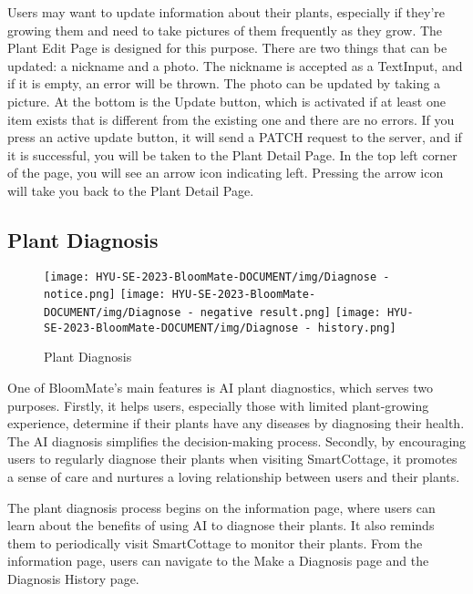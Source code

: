 \documentclass[conference, a4paper]{IEEEtran}
\begin{document}
    Users may want to update information about their plants, especially if they're growing them and need to take pictures of them frequently as they grow. The Plant Edit Page is designed for this purpose. There are two things that can be updated: a nickname and a photo. The nickname is accepted as a TextInput, and if it is empty, an error will be thrown. The photo can be updated by taking a picture. At the bottom is the Update button, which is activated if at least one item exists that is different from the existing one and there are no errors. If you press an active update button, it will send a PATCH request to the server, and if it is successful, you will be taken to the Plant Detail Page. In the top left corner of the page, you will see an arrow icon indicating left. Pressing the arrow icon will take you back to the Plant Detail Page.
    

    \subsection{Plant Diagnosis}
    \begin{figure}[h]
    \centerline{
        \texttt{[image: HYU-SE-2023-BloomMate-DOCUMENT/img/Diagnose - notice.png]}
        \texttt{[image: HYU-SE-2023-BloomMate-DOCUMENT/img/Diagnose - negative result.png]}
        \texttt{[image: HYU-SE-2023-BloomMate-DOCUMENT/img/Diagnose - history.png]}
    }
    \label{fig}
    \caption{Plant Diagnosis}
    \end{figure}
One of BloomMate's main features is AI plant diagnostics, which serves two purposes. Firstly, it helps users, especially those with limited plant-growing experience, determine if their plants have any diseases by diagnosing their health. The AI diagnosis simplifies the decision-making process. Secondly, by encouraging users to regularly diagnose their plants when visiting SmartCottage, it promotes a sense of care and nurtures a loving relationship between users and their plants.

The plant diagnosis process begins on the information page, where users can learn about the benefits of using AI to diagnose their plants. It also reminds them to periodically visit SmartCottage to monitor their plants. From the information page, users can navigate to the Make a Diagnosis page and the Diagnosis History page.\\
\end{document}
